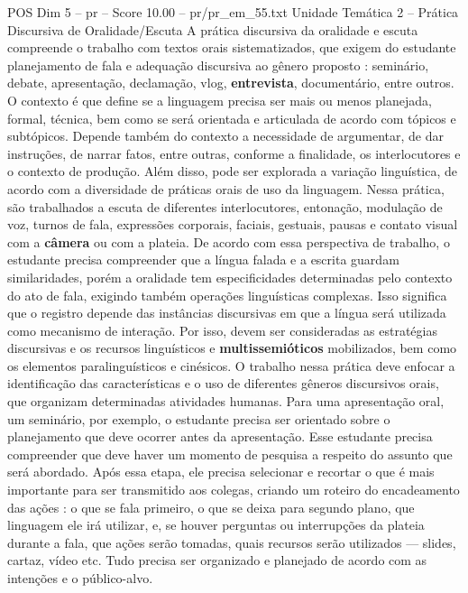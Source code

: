 \begin{textsample}{POS Dim 5 – pr – Score 10.00 – pr/pr\_em\_55.txt}  \label{ex:f5_pos_056}
Unidade Temática 2 – Prática Discursiva de Oralidade/Escuta A prática discursiva da oralidade e escuta compreende o trabalho com textos orais sistematizados, que exigem do estudante planejamento de fala e adequação discursiva ao gênero proposto : seminário, debate, apresentação, declamação, vlog, \textbf{entrevista}, documentário, entre outros.
O contexto é que define se a linguagem precisa ser mais ou menos planejada, formal, técnica, bem como se será orientada e articulada de acordo com tópicos e subtópicos.
Depende também do contexto a necessidade de argumentar, de dar instruções, de narrar fatos, entre outras, conforme a finalidade, os interlocutores e o contexto de produção.
Além disso, pode ser explorada a variação linguística, de acordo com a diversidade de práticas orais de uso da linguagem.
Nessa prática, são trabalhados a escuta de diferentes interlocutores, entonação, modulação de voz, turnos de fala, expressões corporais, faciais, gestuais, pausas e contato visual com a \textbf{câmera} ou com a plateia.
De acordo com essa perspectiva de trabalho, o estudante precisa compreender que a língua falada e a escrita guardam similaridades, porém a oralidade tem especificidades determinadas pelo contexto do ato de fala, exigindo também operações linguísticas complexas.
Isso significa que o registro depende das instâncias discursivas em que a língua será utilizada como mecanismo de interação.
Por isso, devem ser consideradas as estratégias discursivas e os recursos linguísticos e \textbf{multissemióticos} mobilizados, bem como os elementos paralinguísticos e cinésicos.
O trabalho nessa prática deve enfocar a identificação das características e o uso de diferentes gêneros discursivos orais, que organizam determinadas atividades humanas.
Para uma apresentação oral, um seminário, por exemplo, o estudante precisa ser orientado sobre o planejamento que deve ocorrer antes da apresentação.
Esse estudante precisa compreender que deve haver um momento de pesquisa a respeito do assunto que será abordado.
Após essa etapa, ele precisa selecionar e recortar o que é mais importante para ser transmitido aos colegas, criando um roteiro do encadeamento das ações : o que se fala primeiro, o que se deixa para segundo plano, que linguagem ele irá utilizar, e, se houver perguntas ou interrupções da plateia durante a fala, que ações serão tomadas, quais recursos serão utilizados — slides, cartaz, vídeo etc.
Tudo precisa ser organizado e planejado de acordo com as intenções e o público-alvo.

\end{textsample}
